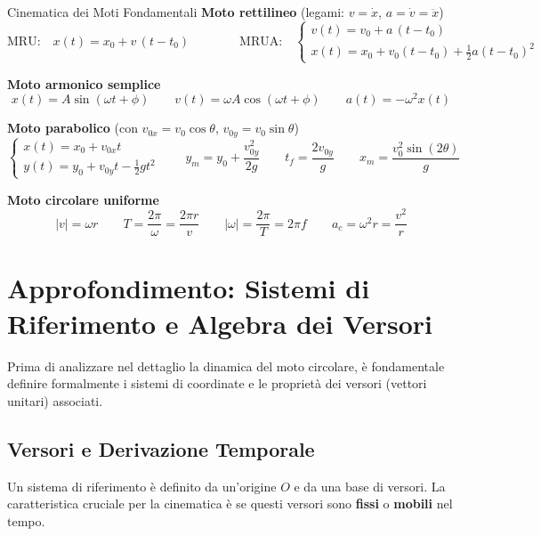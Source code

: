 \clearpage
\begin{formulario}{Cinematica dei Moti Fondamentali}
\textbf{Moto rettilineo} \quad (legami: $v = \dot{x}$, \; $a = \dot{v} = \ddot{x}$)
\begin{equation*}
    \text{MRU:} \quad x(t) = x_0 + v\,(t - t_0)
    \qquad\qquad
    \text{MRUA:} \quad
    \begin{cases}
        v(t) = v_0 + a\,(t-t_0) \\[2pt]
        x(t) = x_0 + v_0 (t-t_0) + \tfrac{1}{2} a (t-t_0)^2
    \end{cases}
\end{equation*}

\medskip
\textbf{Moto armonico semplice}
\begin{equation*}
    x(t) = A\sin(\omega t + \phi)
    \qquad
    v(t) = \omega A\cos(\omega t + \phi)
    \qquad
    a(t) = -\omega^2 x(t)
\end{equation*}

\medskip
\textbf{Moto parabolico} \quad (con $v_{0x} = v_0\cos\theta$, \; $v_{0y} = v_0\sin\theta$)
\begin{equation*}
    \begin{cases}
        x(t) = x_0 + v_{0x} t \\[2pt]
        y(t) = y_0 + v_{0y} t - \tfrac{1}{2} g t^2
    \end{cases}
    \qquad
    y_m = y_0 + \frac{v_{0y}^2}{2g}
    \qquad
    t_f = \frac{2 v_{0y}}{g}
    \qquad
    x_m = \frac{v_0^2 \sin(2\theta)}{g}
\end{equation*}

\medskip
\textbf{Moto circolare uniforme}
\begin{equation*}
    |v| = \omega r
    \qquad
    T = \frac{2\pi}{\omega} = \frac{2\pi r}{v}
    \qquad
    |\omega| = \frac{2\pi}{T} = 2\pi f
    \qquad
    a_c = \omega^2 r = \frac{v^2}{r}
\end{equation*}
\end{formulario}

\section{Approfondimento: Sistemi di Riferimento e Algebra dei Versori}
Prima di analizzare nel dettaglio la dinamica del moto circolare, è fondamentale definire formalmente i sistemi di coordinate e le proprietà dei versori (vettori unitari) associati.

\subsection{Versori e Derivazione Temporale}
Un sistema di riferimento è definito da un'origine $O$ e da una base di versori. La caratteristica cruciale per la cinematica è se questi versori sono \textbf{fissi} o \textbf{mobili} nel tempo.

